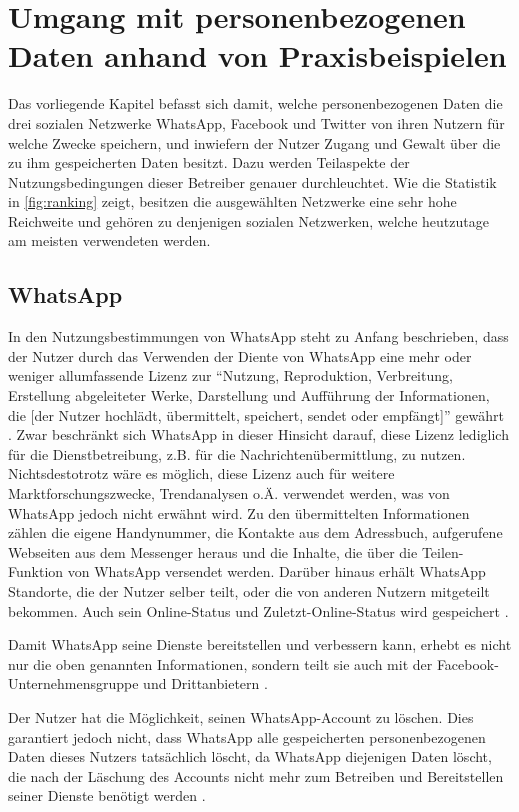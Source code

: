



\chapter{Umgang mit personenbezogenen Daten anhand von Praxisbeispielen}
Das vorliegende Kapitel befasst sich damit, welche personenbezogenen Daten die drei sozialen Netzwerke WhatsApp, Facebook und Twitter von ihren Nutzern für welche Zwecke speichern, und inwiefern der Nutzer Zugang und Gewalt über die zu ihm gespeicherten Daten besitzt. Dazu werden Teilaspekte der Nutzungsbedingungen dieser Betreiber genauer durchleuchtet. Wie die Statistik in \vref{fig:ranking} zeigt, besitzen die ausgewählten Netzwerke eine sehr hohe Reichweite und gehören zu denjenigen sozialen Netzwerken, welche heutzutage am meisten verwendeten werden.

\section{WhatsApp}
In den Nutzungsbestimmungen von WhatsApp steht zu Anfang beschrieben, dass der Nutzer durch das Verwenden der Diente von WhatsApp eine mehr oder weniger allumfassende Lizenz zur "`Nutzung, Reproduktion, Verbreitung, Erstellung abgeleiteter Werke, Darstellung und Aufführung der Informationen, die [der Nutzer hochlädt, übermittelt, speichert, sendet oder empfängt]"' gewährt \autocite[][]{WhatsAppInc..2017}. Zwar beschränkt sich WhatsApp in dieser Hinsicht darauf, diese Lizenz lediglich für die Dienstbetreibung, z.B. für die Nachrichtenübermittlung, zu nutzen. Nichtsdestotrotz wäre es möglich, diese Lizenz auch für weitere Marktforschungszwecke, Trendanalysen o.Ä. verwendet werden, was von WhatsApp jedoch nicht erwähnt wird. Zu den übermittelten Informationen zählen die eigene Handynummer, die Kontakte aus dem Adressbuch, aufgerufene Webseiten aus dem Messenger heraus und die Inhalte, die über die Teilen-Funktion von WhatsApp versendet werden. Darüber hinaus erhält WhatsApp Standorte, die der Nutzer selber teilt, oder die von anderen Nutzern mitgeteilt bekommen. Auch sein Online-Status und Zuletzt-Online-Status wird gespeichert \autocite[vgl.][]{WhatsAppInc..2017}.
\par
Damit WhatsApp seine Dienste bereitstellen und verbessern kann, erhebt es nicht nur die oben genannten Informationen, sondern teilt sie auch mit der Facebook-Unternehmensgruppe und Drittanbietern \autocite[vgl.][]{WhatsAppInc..2017}.
\par
Der Nutzer hat die Möglichkeit, seinen WhatsApp-Account zu löschen. Dies garantiert jedoch nicht, dass WhatsApp alle gespeicherten personenbezogenen Daten dieses Nutzers tatsächlich löscht, da WhatsApp diejenigen Daten löscht, die nach der Läschung des Accounts nicht mehr zum Betreiben und Bereitstellen seiner Dienste benötigt werden \autocite[vgl.][]{WhatsAppInc..2017}.

